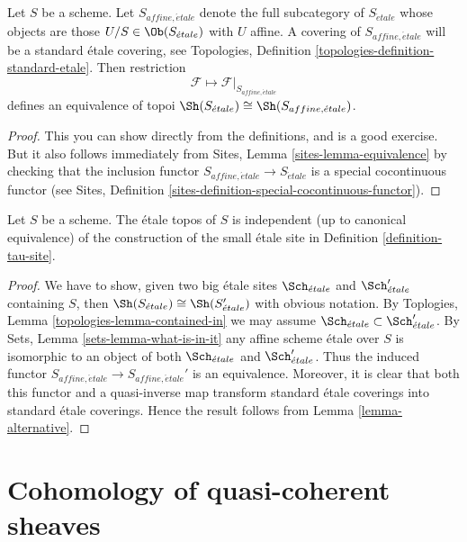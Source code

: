 \begin{lemma}
\label{lemma-alternative}
Let $S$ be a scheme. Let $S_{affine, \acute{e}tale}$ denote the
full subcategory of $S_{\acute{e}tale}$
whose objects are those $U/S \in \Ob(S_{\acute{e}tale})$ with
$U$ affine. A covering of $S_{affine, \acute{e}tale}$ will be a standard
\'etale covering, see
Topologies, Definition \ref{topologies-definition-standard-etale}.
Then restriction
$$
\mathcal{F} \longmapsto \mathcal{F}|_{S_{affine, \acute{e}tale}}
$$
defines an equivalence of topoi
$\Sh(S_{\acute{e}tale}) \cong \Sh(S_{affine, \acute{e}tale})$.
\end{lemma}

\begin{proof}
This you can show directly from the definitions, and is a good exercise.
But it also follows immediately from
Sites, Lemma \ref{sites-lemma-equivalence}
by checking that the inclusion functor
$S_{affine, \acute{e}tale} \to S_{\acute{e}tale}$
is a special cocontinuous functor (see
Sites, Definition \ref{sites-definition-special-cocontinuous-functor}).
\end{proof}

\begin{lemma}
\label{lemma-etale-topos-independent-partial-universe}
Let $S$ be a scheme. The \'etale topos of $S$ is independent
(up to canonical equivalence) of the construction of the small
\'etale site in Definition \ref{definition-tau-site}.
\end{lemma}

\begin{proof}
We have to show, given two big \'etale sites
$\Sch_{\acute{e}tale}$ and $\Sch_{\acute{e}tale}'$ containing
$S$, then $\Sh(S_{\acute{e}tale}) \cong \Sh(S_{\acute{e}tale}')$
with obvious notation. By Toplogies, Lemma \ref{topologies-lemma-contained-in}
we may assume $\Sch_{\acute{e}tale} \subset \Sch_{\acute{e}tale}'$.
By Sets, Lemma \ref{sets-lemma-what-is-in-it}
any affine scheme \'etale over $S$ is isomorphic to an object
of both $\Sch_{\acute{e}tale}$ and $\Sch_{\acute{e}tale}'$.
Thus the induced functor
$S_{affine, \acute{e}tale} \to S_{affine, \acute{e}tale}'$
is an equivalence. Moreover, it is clear that both this functor
and a quasi-inverse map transform standard \'etale coverings into
standard \'etale coverings.
Hence the result follows from Lemma \ref{lemma-alternative}.
\end{proof}





\section{Cohomology of quasi-coherent sheaves}
\label{section-cohomology-quasi-coherent}

